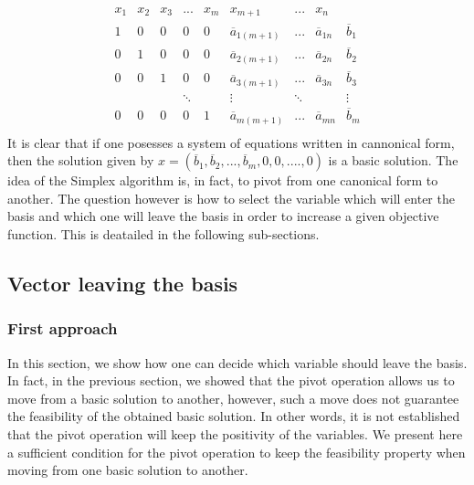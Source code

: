 \begin{equation*}
    \begin{array}{cccccccc|c}
        x_1 & x_2 & x_3 & ... & x_m & x_{m+1} & ... & x_n \\\hline
        1 & 0 & 0 & 0 & 0 & \overline a_{1(m+1)} & ... & \overline a_{1n} & \overline b_1 \\
        0 & 1 & 0 & 0 & 0 & \overline a_{2(m+1)} & ... & \overline a_{2n} & \overline b_2 \\
        0 & 0 & 1 & 0 & 0 & \overline a_{3(m+1)} & ... & \overline a_{3n} & \overline b_3 \\
        & & & \ddots & & \vdots & \ddots & & \vdots\\
        0 & 0 & 0 & 0 & 1 & \overline a_{m(m+1)} & ... & \overline a_{mn} & \overline b_m \\
    \end{array}
\end{equation*} It is clear that if one posesses a system of equations written in cannonical form, then the solution given by $x = (\overline b_1, \overline b_2, ..., \overline b_m, 0, 0, ...., 0)$ is a basic solution. The idea of the Simplex algorithm is, in fact, to pivot from one canonical form to another. The question however is how to select the variable which will enter the basis and which one will leave the basis in order to increase a given objective function. This is deatailed in the following sub-sections. 

\subsection{Vector leaving the basis}

\subsubsection{First approach}

In this section, we show how one can decide which variable should leave the basis. In fact, in the previous section, we showed that the pivot operation allows us to move from a basic solution to another, however, such a move does not guarantee the feasibility of the obtained basic solution. In other words, it is not established that the pivot operation will keep the positivity of the variables. We present here a sufficient condition for the pivot operation to keep the feasibility property when moving from one basic solution to another. 

